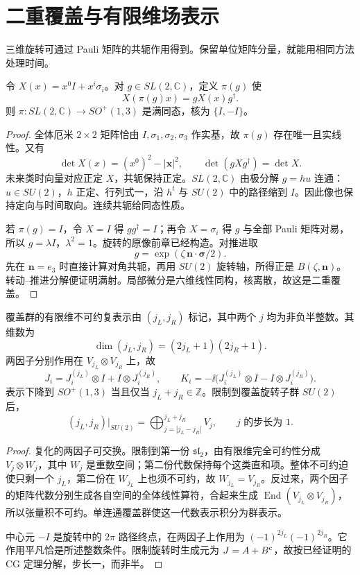 \section{二重覆盖与有限维场表示}

三维旋转可通过 Pauli 矩阵的共轭作用得到。保留单位矩阵分量，就能用相同方法处理时间。

\begin{theorem}
令 $X(x)=x^0I+x^i\sigma_i$。对 $g\in SL(2,\mathbb C)$，定义 $\pi(g)$ 使
\[
 X(\pi(g)x)=gX(x)g^\dagger.
\]
则 $\pi:SL(2,\mathbb C)\to SO^+(1,3)$ 是满同态，核为 $\{I,-I\}$。
\end{theorem}
\begin{proof}
全体厄米 $2\times2$ 矩阵恰由 $I,\sigma_1,\sigma_2,\sigma_3$ 作实基，故 $\pi(g)$ 存在唯一且实线性。又有
\[
 \det X(x)=(x^0)^2-|\mathbf x|^2,
 \qquad \det(gXg^\dagger)=\det X.
\]
未来类时向量对应正定 $X$，共轭保持正定。$SL(2,\mathbb C)$ 由极分解 $g=hu$ 连通：$u\in SU(2)$，$h$ 正定、行列式一，沿 $h^t$ 与 $SU(2)$ 中的路径缩到 $I$。因此像也保持定向与时间取向。连续共轭给同态性质。

若 $\pi(g)=I$，令 $X=I$ 得 $gg^\dagger=I$；再令 $X=\sigma_i$ 得 $g$ 与全部 Pauli 矩阵对易，所以 $g=\lambda I$，$\lambda^2=1$。旋转的原像前章已经构造。对推进取
\[
 g=\exp(\zeta\,\mathbf n\cdot\boldsymbol\sigma/2).
\]
先在 $\mathbf n=e_3$ 时直接计算对角共轭，再用 $SU(2)$ 旋转轴，所得正是 $B(\zeta,\mathbf n)$。转动--推进分解便证明满射。局部微分是六维线性同构，核离散，故这是二重覆盖。
\end{proof}

\begin{theorem}[有限维不可约表示与下降条件]
覆盖群的有限维不可约复表示由 $(j_L,j_R)$ 标记，其中两个 $j$ 均为非负半整数。其维数为
\begin{equation}
 \dim(j_L,j_R)=(2j_L+1)(2j_R+1).
 \label{eq:finite-dim-lorentz}
\end{equation}
两因子分别作用在 $V_{j_L}\otimes V_{j_R}$ 上，故
\[
 J_i=J_i^{(j_L)}\otimes I+I\otimes J_i^{(j_R)},\qquad
 K_i=-\ii\bigl(J_i^{(j_L)}\otimes I-I\otimes J_i^{(j_R)}\bigr).
\]
表示下降到 $SO^+(1,3)$ 当且仅当 $j_L+j_R\in\mathbb Z$。限制到覆盖旋转子群 $SU(2)$ 后，
\begin{equation}
 (j_L,j_R)\big|_{SU(2)}=\bigoplus_{j=|j_L-j_R|}^{j_L+j_R}V_j,
 \qquad j\text{ 的步长为 }1.
 \label{eq:lorentz-rotation-restriction}
\end{equation}
\end{theorem}
\begin{proof}
复化的两因子可交换。限制到第一份 $\mathfrak{sl}_2$，由有限维完全可约性分成 $V_j\otimes W_j$，其中 $W_j$ 是重数空间；第二份代数保持每个这类直和项。整体不可约迫使只剩一个 $j_L$，第二份在 $W_{j_L}$ 上也须不可约，故 $W_{j_L}=V_{j_R}$。反过来，两个因子的矩阵代数分别生成各自空间的全体线性算符，合起来生成 $\operatorname{End}(V_{j_L}\otimes V_{j_R})$，所以张量积不可约。单连通覆盖群使这一代数表示积分为群表示。

中心元 $-I$ 是旋转中的 $2\pi$ 路径终点，在两因子上作用为 $(-1)^{2j_L}(-1)^{2j_R}$。它作用平凡恰是所述整数条件。限制旋转时生成元为 $J=A+B^{\rm c}$，故按已经证明的 CG 定理分解，步长一，而非半。
\end{proof}

